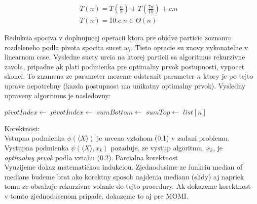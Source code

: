 \documentclass[paper=a4, fontsize=11pt]{scrartcl} %
\numberwithin{equation}{section} %
\numberwithin{figure}{section} %
\numberwithin{table}{section} %
\begin{document}
\begin{equation}
    \begin{aligned}
        T(n) = T\left(\frac{n}{5}\right) + T\left(\frac{7n}{10}\right)+c.n \\
        T(n) = 10.c.n \in \Theta(n)
    \end{aligned}
\end{equation}

Redukcia spociva v doplnujucej operacii ktora pre obidve particie zoznamu rozdeleneho podla pivota spocita sucet $w_i$.
Tieto opracie su znovy vykonatelne v linearnom case. Vysledne sucty urcia na ktorej particii sa algoritmus rekurzivne zavola, pripadne ak plati podmienka pre optimalny prvok postupnosti, vypocet skonci. To znamena ze parameter mozeme odstranit parameter $n$ ktory je po tejto uprave nepotrebny (kazda postupnost ma unikatny optimalny prvok). Vysledny upraveny algoritmus je nasledovny:

\begin{algorithmic}[1]
       	\State $pivotIndex \gets$ 
        \State $pivotIndex \gets$ 
        \State $sumBottom \gets$ 
        \State $sumTop \gets$ 
            \State \Return {}
            \State \Return {}
        \Else
            \State \Return $list[n]$
        \EndIf
    \EndFunction \\
    	\State \Return {}    
    \EndFunction
\end{algorithmic}

Korektnost: \\
Vstupna podmienka $\phi(\langle X \rangle)$ je urcena vztahom (0.1) v zadani problemu.\\
Vystupna podmienka $\psi(\langle X \rangle, x_k)$ pozaduje, ze vystup algoritmu, $x_k$, je {\em optimalny prvok} podla vztahu (0.2).
Parcialna korektnost \\
Vyuzijeme dokaz matematickou indukciou. Zjednodusime ze funkciu median of medians budeme brat ako korektny sposob najdenia medianu (slidy) aj napriek tomu ze obsahuje rekurzivne volanie do tejto procedury. Ak dokazeme korektnost v tomto zjednodusenom pripade, dokazeme to aj pre MOMI. 
\end{document}
